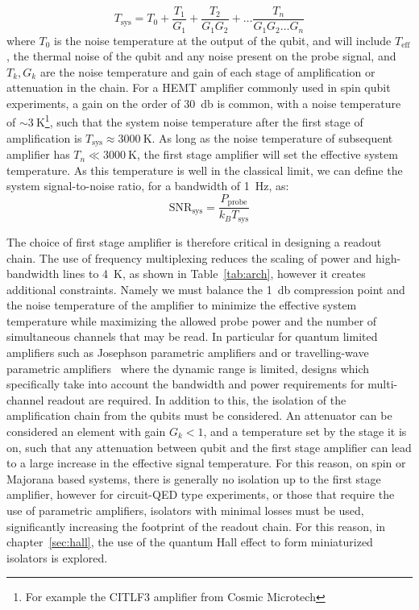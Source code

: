 \begin{equation}
  T_\textrm{sys} = T_{0} + \frac{T_{1}}{G_1} + \frac{T_{2}}{G_1G_2} + \ldots \frac{T_{n}}{G_1G_2 \ldots G_{n}}
\end{equation}
where $T_{0}$ is the noise temperature at the output of the qubit, and will include $T_\textrm{eff}$, the thermal noise of the qubit and any noise present on the
probe signal, and $T_k,G_k$ are the noise temperature and gain of each stage of amplification or attenuation in the chain. For a HEMT amplifier commonly used in
spin qubit experiments, a gain on the order of \SI{30}{\decibel} is common, with a noise temperature of $\sim \SI{3}{\kelvin}$\footnote{For example the CITLF3 amplifier
from Cosmic Microtech}, such that the system noise temperature after the first stage of amplification is $T_\textrm{sys} \approx \SI{3000}{\kelvin}$. As long as the
noise temperature of subsequent amplifier has $T_n \ll \SI{3000}{\kelvin}$, the first stage amplifier will set the effective system temperature. As this temperature is well in the
classical limit, we can define the system signal-to-noise ratio, for a bandwidth of \SI{1}{\hertz}, as:
\begin{equation}
  \textrm{SNR}_\textrm{sys} = \frac{P_\textrm{probe}}{k_B T_\textrm{sys}}
\end{equation}

The choice of first stage amplifier is therefore critical in designing a readout chain. The use of frequency multiplexing reduces the scaling of power and high-bandwidth
lines to \SI{4}{\kelvin}, as shown in Table~\ref{tab:arch}, however it creates additional constraints. Namely we must balance the \SI{1}{\decibel} compression point and
the noise temperature of the amplifier to minimize the effective system temperature while maximizing the allowed probe power and the number of simultaneous channels that
may be read. In particular for quantum limited amplifiers such as Josephson parametric amplifiers and or travelling-wave parametric amplifiers~\cite{Macklin307}
where the dynamic range is limited, designs which specifically take into account the bandwidth and power requirements for multi-channel readout are required. In addition
to this, the isolation of the amplification chain from the qubits must be considered. An attenuator can be considered an element with gain $G_k < 1$, and a temperature
set by the stage it is on, such that any attenuation between qubit and the first stage amplifier can lead to a large increase in the effective signal temperature. For this
reason, on spin or Majorana based systems, there is generally no isolation up to the first stage amplifier, however for circuit-QED type experiments, or those that require
the use of parametric amplifiers, isolators with minimal losses must be used, significantly increasing the footprint of the readout chain. For this reason, in
chapter~\ref{sec:hall}, the use of the quantum Hall effect to form miniaturized isolators is explored.

